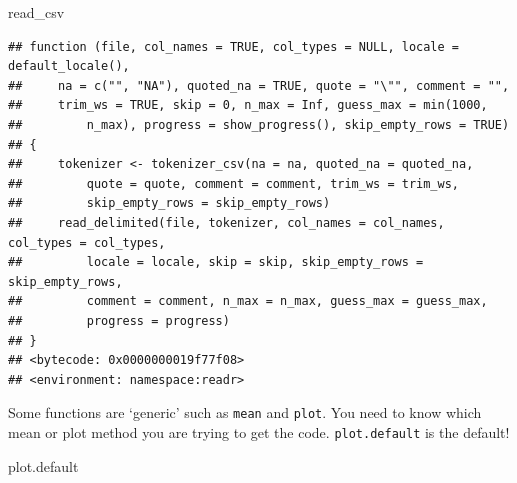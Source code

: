 \documentclass[
]{book}
\newenvironment{Shaded}{\begin{snugshade}}{\end{snugshade}}
\newcommand{\NormalTok}[1]{#1}
\theoremstyle{definition}
\theoremstyle{definition}
\theoremstyle{definition}
\theoremstyle{remark}
\begin{document}
\begin{Shaded}
\begin{Highlighting}[]
\NormalTok{read_csv}
\end{Highlighting}
\end{Shaded}

\begin{verbatim}
## function (file, col_names = TRUE, col_types = NULL, locale = default_locale(), 
##     na = c("", "NA"), quoted_na = TRUE, quote = "\"", comment = "", 
##     trim_ws = TRUE, skip = 0, n_max = Inf, guess_max = min(1000, 
##         n_max), progress = show_progress(), skip_empty_rows = TRUE) 
## {
##     tokenizer <- tokenizer_csv(na = na, quoted_na = quoted_na, 
##         quote = quote, comment = comment, trim_ws = trim_ws, 
##         skip_empty_rows = skip_empty_rows)
##     read_delimited(file, tokenizer, col_names = col_names, col_types = col_types, 
##         locale = locale, skip = skip, skip_empty_rows = skip_empty_rows, 
##         comment = comment, n_max = n_max, guess_max = guess_max, 
##         progress = progress)
## }
## <bytecode: 0x0000000019f77f08>
## <environment: namespace:readr>
\end{verbatim}

Some functions are `generic' such as \texttt{mean} and \texttt{plot}. You need to know which mean or plot method you are trying to get the code. \texttt{plot.default} is the default!

\begin{Shaded}
\begin{Highlighting}[]
\NormalTok{plot.default}
\end{Highlighting}
\end{Shaded}
\end{document}
